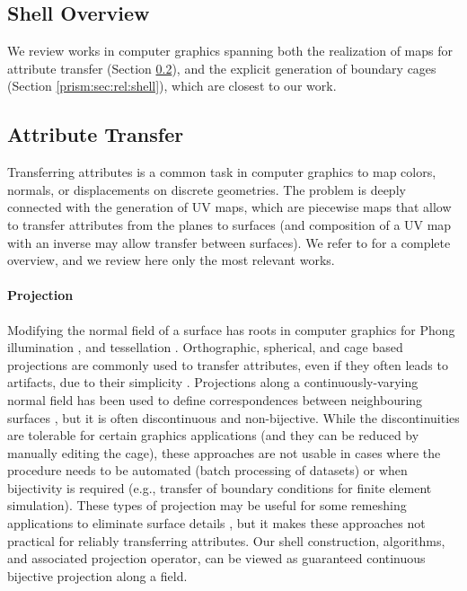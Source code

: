 \subsection{Shell Overview}
\label{prism:sec:related}
We review works in computer graphics spanning both the realization of maps for attribute transfer (Section \ref{prism:sec:rel:transfer}), and the explicit generation of boundary cages (Section \ref{prism:sec:rel:shell}), which are closest to our work.

\subsection{Attribute Transfer}
\label{prism:sec:rel:transfer}

Transferring attributes is a common task in computer graphics to map colors, normals, or displacements on discrete geometries. 
The problem is deeply connected with the generation of UV maps, which are piecewise maps that allow to transfer attributes from the planes to surfaces (and composition of a UV map with an inverse may allow transfer between surfaces).  We refer to \cite{FloaterSurvey:2005,Sheffer:2006,Hormann:2007} for a complete overview, and we review here only the most relevant works.

\paragraph{Projection} 
Modifying the normal field of a surface has roots in computer graphics for Phong illumination \cite{phong1975illumination}, and tessellation \cite{boubekeur2008phong}.  Orthographic, spherical, and cage based projections are commonly used to transfer attributes, even if they often leads to artifacts, due to their simplicity {\cite{blender,nguyen2007gpu}}. 
Projections along a continuously-varying normal field has been used to define correspondences between neighbouring surfaces \cite{kobbelt1998interactive,lee2000displaced,panozzo2013weighted,Ezuz:2019}, but it is often discontinuous and non-bijective. While the discontinuities are tolerable for certain graphics applications (and they can be reduced by manually editing the cage), these approaches are not usable in cases where the procedure needs to be automated (batch processing of datasets) or when bijectivity is required (e.g., transfer of boundary conditions for finite element simulation).  These types of projection may be useful for some remeshing applications to eliminate surface details \cite{ebke2014level}, but it makes these approaches not practical for reliably transferring attributes. Our shell construction, algorithms, and associated projection operator, can be viewed as guaranteed continuous bijective  projection along a field. 

